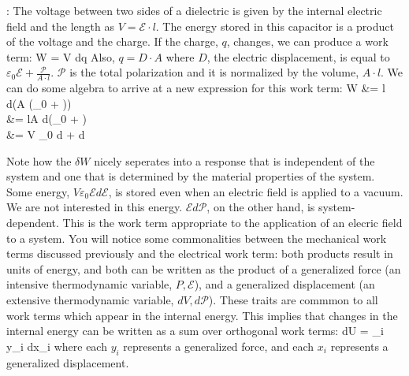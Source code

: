 \documentclass[12pt]{article}
\begin{document}
: The voltage between two sides of a dielectric is given by the internal electric field and the length as $V = \mathcal{E} \cdot l$.  The energy stored in this capacitor is a product of the voltage and the charge.  If the charge, $q$, changes, we can produce a work term:
\eqs
\delta W = V dq
\eqe
Also, $q=D \cdot A$ where $D$, the electric displacement, is equal to $\varepsilon_0 \mathcal{E} + \frac{\mathcal{P}}{A\cdot l}$.  $\mathcal{P}$ is the total polarization and it is normalized by the volume, $A\cdot l$. We can do some algebra to arrive at a new expression for this work term:
\eqs
\delta W &=  l  \cdot d(A (\varepsilon_0  + ))\\
&= lA \cdot d(\varepsilon_0  + )\\
&= V \varepsilon_0  d +  d
\eqe

Note how the $\delta W$ nicely seperates into a response that is independent of the system and one that is determined by the material properties of the system. Some energy, $V \varepsilon_0 \mathcal{E} d\mathcal{E}$, is stored even when an electric field is applied to a vacuum. We are not interested in this energy. $\mathcal{E} d\mathcal{P}$, on the other hand, is system-dependent. This is the work term appropriate to the application of an elecric field to a system. You will notice some commonalities between the mechanical work terms discussed previously and the electrical work term: both products result in units of energy, and both can be written as the product of a generalized force (an intensive thermodynamic variable, $P,\mathcal{E}$), and a generalized displacement (an extensive thermodynamic variable, $dV,d\mathcal{P}$). These traits are commmon to all work terms which appear in the internal energy. This implies that changes in the internal energy can be written as a sum over orthogonal work terms:
\eqs
dU = \sum_i y_i dx_i
\eqe
where each $y_i$ represents a generalized force, and each $x_i$ represents a generalized displacement.
\end{document}
